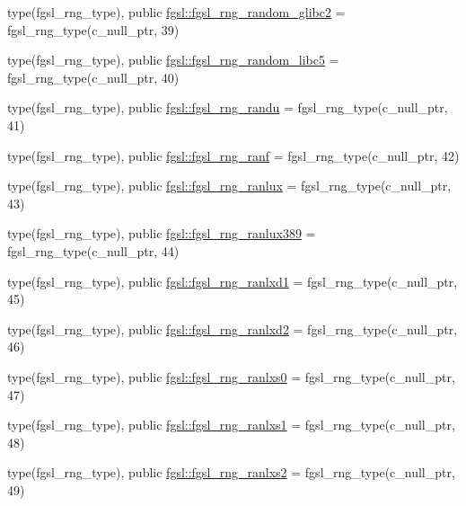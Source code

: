 \begin{DoxyCompactItemize}
\item 
type(fgsl\+\_\+rng\+\_\+type), public \hyperlink{namespacefgsl_aa5b21e91890ada1ae4bef30981f67da1}{fgsl\+::fgsl\+\_\+rng\+\_\+random\+\_\+glibc2} = fgsl\+\_\+rng\+\_\+type(c\+\_\+null\+\_\+ptr, 39)
\item 
type(fgsl\+\_\+rng\+\_\+type), public \hyperlink{namespacefgsl_a642018575871b9b658058f7540ffce03}{fgsl\+::fgsl\+\_\+rng\+\_\+random\+\_\+libc5} = fgsl\+\_\+rng\+\_\+type(c\+\_\+null\+\_\+ptr, 40)
\item 
type(fgsl\+\_\+rng\+\_\+type), public \hyperlink{namespacefgsl_a27e0ade0cf0e6155c944ca520547c4a8}{fgsl\+::fgsl\+\_\+rng\+\_\+randu} = fgsl\+\_\+rng\+\_\+type(c\+\_\+null\+\_\+ptr, 41)
\item 
type(fgsl\+\_\+rng\+\_\+type), public \hyperlink{namespacefgsl_a40a3682ade652628973e925312f78240}{fgsl\+::fgsl\+\_\+rng\+\_\+ranf} = fgsl\+\_\+rng\+\_\+type(c\+\_\+null\+\_\+ptr, 42)
\item 
type(fgsl\+\_\+rng\+\_\+type), public \hyperlink{namespacefgsl_a52505d0b341c829d785f2a0005575a40}{fgsl\+::fgsl\+\_\+rng\+\_\+ranlux} = fgsl\+\_\+rng\+\_\+type(c\+\_\+null\+\_\+ptr, 43)
\item 
type(fgsl\+\_\+rng\+\_\+type), public \hyperlink{namespacefgsl_a1403f9766b272caac077f138b24156ba}{fgsl\+::fgsl\+\_\+rng\+\_\+ranlux389} = fgsl\+\_\+rng\+\_\+type(c\+\_\+null\+\_\+ptr, 44)
\item 
type(fgsl\+\_\+rng\+\_\+type), public \hyperlink{namespacefgsl_a524c5eebeb98cf095b5bfe9bde105de5}{fgsl\+::fgsl\+\_\+rng\+\_\+ranlxd1} = fgsl\+\_\+rng\+\_\+type(c\+\_\+null\+\_\+ptr, 45)
\item 
type(fgsl\+\_\+rng\+\_\+type), public \hyperlink{namespacefgsl_ab9c54c86c74196b01b8038402c43038a}{fgsl\+::fgsl\+\_\+rng\+\_\+ranlxd2} = fgsl\+\_\+rng\+\_\+type(c\+\_\+null\+\_\+ptr, 46)
\item 
type(fgsl\+\_\+rng\+\_\+type), public \hyperlink{namespacefgsl_a7114194063748411f9f00507745269fa}{fgsl\+::fgsl\+\_\+rng\+\_\+ranlxs0} = fgsl\+\_\+rng\+\_\+type(c\+\_\+null\+\_\+ptr, 47)
\item 
type(fgsl\+\_\+rng\+\_\+type), public \hyperlink{namespacefgsl_aa3756069479859f5b94693230b23f052}{fgsl\+::fgsl\+\_\+rng\+\_\+ranlxs1} = fgsl\+\_\+rng\+\_\+type(c\+\_\+null\+\_\+ptr, 48)
\item 
type(fgsl\+\_\+rng\+\_\+type), public \hyperlink{namespacefgsl_a961029daf705e420d4626038ceffbdc5}{fgsl\+::fgsl\+\_\+rng\+\_\+ranlxs2} = fgsl\+\_\+rng\+\_\+type(c\+\_\+null\+\_\+ptr, 49)
\item 

\end{DoxyCompactItemize}
